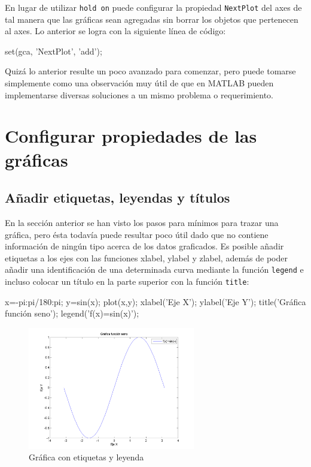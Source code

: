 En lugar de utilizar \texttt{hold on} puede configurar la propiedad
\texttt{NextPlot} del axes de tal manera que las gráficas sean agregadas
sin borrar los objetos que pertenecen al axes. Lo anterior se logra con
la siguiente línea de código:

\begin{matlab}
set(gca, 'NextPlot', 'add');
\end{matlab}

Quizá lo anterior resulte un poco avanzado para comenzar, pero puede
tomarse simplemente como una observación muy útil de que en MATLAB
pueden implementarse diversas soluciones a un mismo problema o
requerimiento.

\section{Configurar propiedades de las gráficas}

\subsection{Añadir etiquetas, leyendas y títulos}

En la sección anterior se han visto los pasos para mínimos para trazar
una gráfica, pero ésta todavía puede resultar poco útil dado que no
contiene información de ningún tipo acerca de los datos graficados. Es
posible añadir etiquetas a los ejes con las funciones xlabel, ylabel y
zlabel, además de poder añadir una identificación de una determinada
curva mediante la función \texttt{legend} e incluso colocar un título en
la parte superior con la función \texttt{title}:

\begin{matlab}
x=-pi:pi/180:pi;
y=sin(x);
plot(x,y);
xlabel('Eje X');
ylabel('Eje Y');
title('Gráfica función seno');
legend('f(x)=sin(x)');
\end{matlab}

\begin{figure}[htbp]
    \centering
    \includegraphics[width=0.65\textwidth]{src/img/ch4/img_4_4.png}
    \caption{Gráfica con etiquetas y leyenda}
    \label{fig:img_4_4}
\end{figure}

